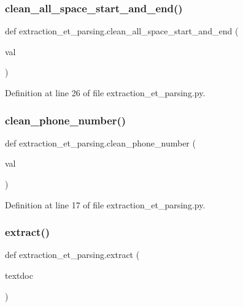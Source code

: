 \subsubsection{\texorpdfstring{clean\+\_\+all\+\_\+space\+\_\+start\+\_\+and\+\_\+end()}{clean\_all\_space\_start\_and\_end()}}
{\footnotesize\ttfamily def extraction\+\_\+et\+\_\+parsing.\+clean\+\_\+all\+\_\+space\+\_\+start\+\_\+and\+\_\+end (\begin{DoxyParamCaption}\item[{}]{val }\end{DoxyParamCaption})}



Definition at line 26 of file extraction\+\_\+et\+\_\+parsing.\+py.

\mbox{\label{namespaceextraction__et__parsing_a7455f32611bca76b435ba91900a42fbd}} 
\subsubsection{\texorpdfstring{clean\+\_\+phone\+\_\+number()}{clean\_phone\_number()}}
{\footnotesize\ttfamily def extraction\+\_\+et\+\_\+parsing.\+clean\+\_\+phone\+\_\+number (\begin{DoxyParamCaption}\item[{}]{val }\end{DoxyParamCaption})}



Definition at line 17 of file extraction\+\_\+et\+\_\+parsing.\+py.

\mbox{\label{namespaceextraction__et__parsing_ac16cd0fc2f8bf7c62a58cc89b5c5c90d}} 
\subsubsection{\texorpdfstring{extract()}{extract()}}
{\footnotesize\ttfamily def extraction\+\_\+et\+\_\+parsing.\+extract (\begin{DoxyParamCaption}\item[{}]{textdoc }\end{DoxyParamCaption})}



